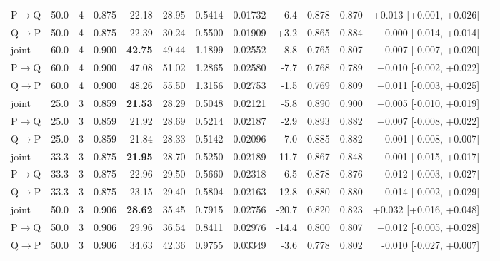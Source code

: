 \documentclass{article}
\begin{document}
\begin{longtable}{llrrrrrrrrrrl}
P$\to$Q & 50.0 & 4 & 0.875 & 22.18 & 28.95 & 0.5414 & 0.01732 & -6.4 & 0.878 & 0.870 & +0.013 [+0.001, +0.026] \\
Q$\to$P & 50.0 & 4 & 0.875 & 22.39 & 30.24 & 0.5500 & 0.01909 & +3.2 & 0.865 & 0.884 & -0.000 [-0.014, +0.014] \\
joint & 60.0 & 4 & 0.900 & \textbf{42.75} & 49.44 & 1.1899 & 0.02552 & -8.8 & 0.765 & 0.807 & +0.007 [-0.007, +0.020] \\
P$\to$Q & 60.0 & 4 & 0.900 & 47.08 & 51.02 & 1.2865 & 0.02580 & -7.7 & 0.768 & 0.789 & +0.010 [-0.002, +0.022] \\
Q$\to$P & 60.0 & 4 & 0.900 & 48.26 & 55.50 & 1.3156 & 0.02753 & -1.5 & 0.769 & 0.809 & +0.011 [-0.003, +0.025] \\
joint & 25.0 & 3 & 0.859 & \textbf{21.53} & 28.29 & 0.5048 & 0.02121 & -5.8 & 0.890 & 0.900 & +0.005 [-0.010, +0.019] \\
P$\to$Q & 25.0 & 3 & 0.859 & 21.92 & 28.69 & 0.5214 & 0.02187 & -2.9 & 0.893 & 0.882 & +0.007 [-0.008, +0.022] \\
Q$\to$P & 25.0 & 3 & 0.859 & 21.84 & 28.33 & 0.5142 & 0.02096 & -7.0 & 0.885 & 0.882 & -0.001 [-0.008, +0.007] \\
joint & 33.3 & 3 & 0.875 & \textbf{21.95} & 28.70 & 0.5250 & 0.02189 & -11.7 & 0.867 & 0.848 & +0.001 [-0.015, +0.017] \\
P$\to$Q & 33.3 & 3 & 0.875 & 22.96 & 29.50 & 0.5660 & 0.02318 & -6.5 & 0.878 & 0.876 & +0.012 [-0.003, +0.027] \\
Q$\to$P & 33.3 & 3 & 0.875 & 23.15 & 29.40 & 0.5804 & 0.02163 & -12.8 & 0.880 & 0.880 & +0.014 [-0.002, +0.029] \\
joint & 50.0 & 3 & 0.906 & \textbf{28.62} & 35.45 & 0.7915 & 0.02756 & -20.7 & 0.820 & 0.823 & +0.032 [+0.016, +0.048] \\
P$\to$Q & 50.0 & 3 & 0.906 & 29.96 & 36.54 & 0.8411 & 0.02976 & -14.4 & 0.800 & 0.807 & +0.012 [-0.005, +0.028] \\
Q$\to$P & 50.0 & 3 & 0.906 & 34.63 & 42.36 & 0.9755 & 0.03349 & -3.6 & 0.778 & 0.802 & -0.010 [-0.027, +0.007] \\
\bottomrule\end{longtable}
\end{document}

